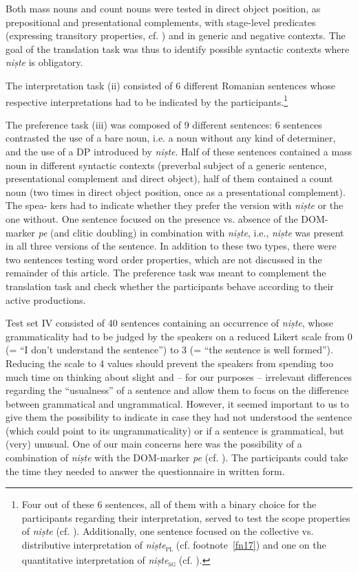 \documentclass[output=paper,colorlinks,citecolor=brown]{langscibook}
\begin{document}
Both mass nouns and count nouns were tested in direct object position, as prepositional and presentational complements, with stage-level predicates (expressing transitory properties, cf. \cite{Carlson1977}) and in generic and negative contexts. The goal of the translation task was thus to identify possible syntactic contexts where \textit{niște} is obligatory.

The interpretation task (ii) consisted of 6 different Romanian sentences whose respective interpretations had to be indicated by the participants.\footnote{Four out of these 6 sentences, all of them with a binary choice for the participants regarding their interpretation, served to test the scope properties of \textit{niște} (cf. ). Additionally, one sentence focused on the collective vs. distributive interpretation of \textit{niște}\textsc{\textsubscript{\textsc{pl}}} (cf. footnote~\ref{fn17}) and one on the quantitative interpretation of \textit{niște}\textsc{\textsubscript{sg} }(cf. \citealt{DavatzStark2019}).}

The preference task (iii) was composed of 9 different sentences: 6 sentences contrasted the use of a bare noun, i.e. a noun without any kind of determiner, and the use of a DP introduced by \textit{niște}. Half of these sentences contained a mass noun in different syntactic contexts (preverbal subject of a generic sentence, presentational complement and direct object), half of them contained a count noun (two times in direct object position, once as a presentational complement). The spea- kers had to indicate whether they prefer the version with \textit{niște} or the one without. One sentence focused on the presence vs. absence of the DOM-marker \textit{pe} (and clitic doubling) in combination with \textit{niște}, i.e., \textit{niște} was present in all three versions of the sentence. In addition to these two types, there were two sentences testing word order properties, which are not discussed in the remainder of this article. The preference task was meant to complement the translation task and check whether the participants behave according to their active productions.

Test set IV consisted of 40 sentences containing an occurrence of \textit{niște}, whose grammaticality had to be judged by the speakers on a reduced Likert scale from 0 (= “I don’t understand the sentence”) to 3 (= “the sentence is well formed”). Reducing the scale to 4 values should prevent the speakers from spending too much time on thinking about slight and – for our purposes – irrelevant differences regarding the “usualness” of a sentence and allow them to focus on the difference between grammatical and ungrammatical. However, it seemed important to us to give them the possibility to indicate in case they had not understood the sentence (which could point to its ungrammaticality) or if a sentence is grammatical, but (very) unusual. One of our main concerns here was the possibility of a combination of \textit{niște} with the DOM-marker \textit{pe} (cf. ). The participants could take the time they needed to answer the questionnaire in written form.
\end{document}
